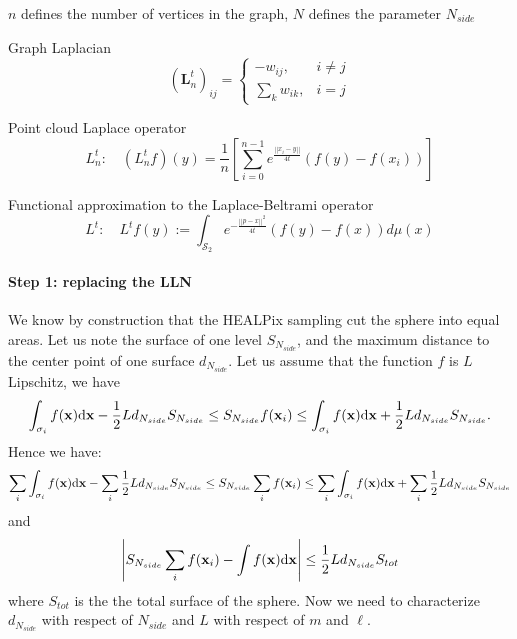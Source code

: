 $n$ defines the number of vertices in the graph, $N$ defines the parameter $N_{side}$
\begin{definition}{Graph Laplacian}
	$$ \left(\mathbf L_n^t\right)_{ij}=\begin{cases}
	-w_{ij}, & i\neq j\\
	\sum_{k}w_{ik}, & i=j
	\end{cases}$$
\end{definition}
\begin{definition}{Point cloud Laplace operator}
	$$L_n^t:\quad(L_n^tf)(y) = \frac{1}{n}\left[ \sum_{i=0}^{n-1} e^\frac{||x_i-y||}{4t}\left(f(y)-f(x_i)\right)\right]$$
\end{definition}
\begin{definition}{Functional approximation to the Laplace-Beltrami operator} \label{eq: my L^t}
	$$L^t:\quad L^tf(y) := \int_{\mathcal S_2}e^{-\frac{||p-x||^2}{4t}}\left(f(y)-f(x)\right)d\mu(x)$$
\end{definition}

\paragraph{Step 1: replacing the LLN}

We know by construction that the HEALPix sampling cut the sphere into equal areas. Let us note the surface of one level $S_{N_{side}}$, and the maximum distance to the center point of one surface\textbf{ $d_{N_{side}}$}.
Let us assume that the function $f$ is $L$ Lipschitz, we have
\[
\int_{\sigma_{i}}f({\bf x})\text{d}{\bf x}-\frac{1}{2}Ld_{N_{side}}S_{N_{side}}\leq S_{N_{side}}f({\bf x}_{i})\leq\int_{\sigma_{i}}f({\bf x})\text{d}{\bf x}+\frac{1}{2}Ld_{N_{side}}S_{N_{side}}.
\]
Hence we have:
\[
\sum_{i}\int_{\sigma_{i}}f({\bf x})\text{d}{\bf x}-\sum_{i}\frac{1}{2}Ld_{N_{side}}S_{N_{side}}\leq S_{N_{side}}\sum_{i}f({\bf x}_{i})\leq\sum_{i}\int_{\sigma_{i}}f({\bf x})\text{d}{\bf x}+\sum_{i}\frac{1}{2}Ld_{N_{side}}S_{N_{side}}
\]
and 
\[
\left|S_{N_{side}}\sum_{i}f({\bf x}_{i})-\int f({\bf x})\text{d}{\bf x}\right|\le\frac{1}{2}Ld_{N_{side}}S_{tot}
\]
where $S_{tot}$ is the the total surface of the sphere. Now we need to characterize $d_{N_{side}}$ with respect of $N_{side}$ and $L$ with respect of $m$ and $\ell$. 

